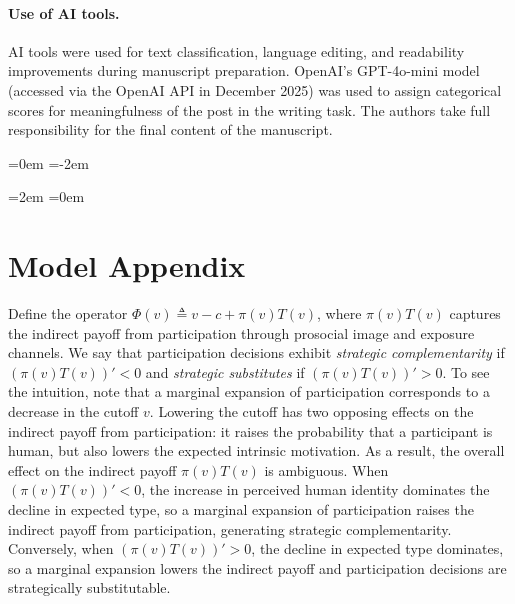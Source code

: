 \documentclass[12pt,notitlepage]{article}
\theoremstyle{plain}
\theoremstyle{plain}
\theoremstyle{definition}
\theoremstyle{definition}
\theoremstyle{assumption}
\theoremstyle{plain}
\theoremstyle{plain}
\theoremstyle{plain}
\theoremstyle{plain}
\theoremstyle{definition}%
\theoremstyle{plain}
\theoremstyle{plain}
\theoremstyle{plain}
\theoremstyle{plain}
\begin{document}
\paragraph{Use of AI tools.}
AI tools were used for text classification, language editing, and readability improvements during manuscript preparation. OpenAI's GPT-4o-mini model (accessed via the OpenAI API in December 2025) was used to assign categorical scores for meaningfulness of the post in the writing task. The authors take full responsibility for the final content of the manuscript.

\newpage\leftskip=0em 
\parindent=-2em
\onehalfspacing




\parindent=2em
\leftskip=0em

\clearpage{}

\pagebreak{}

\appendix

\setcounter{figure}{0} \renewcommand{\thefigure}{A\arabic{figure}}

\setcounter{table}{0} \renewcommand{\thetable}{A\arabic{table}}\pagestyle{fancy}


\section{Model Appendix}\label{appendix:theoretical framework}

Define the operator $\Phi(v)\triangleq v - c + \pi(v)T(v)$, where $\pi(v)T(v)$ captures the indirect payoff from participation through prosocial image and exposure channels. We say that participation decisions exhibit \textit{strategic complementarity} if $(\pi(v)T(v))'<0$ and \textit{strategic substitutes} if $(\pi(v)T(v))'>0$. To see the intuition, note that a marginal expansion of participation corresponds to a decrease in the cutoff $v$. Lowering the cutoff has two opposing effects on the indirect payoff from participation: it raises the probability that a participant is human, but also lowers the expected intrinsic motivation. As a result, the overall effect on the indirect payoff $\pi(v)T(v)$ is ambiguous. When $(\pi(v)T(v))'<0$, the increase in perceived human identity dominates the decline in expected type, so a marginal expansion of participation raises the indirect payoff from participation, generating strategic complementarity. Conversely, when $(\pi(v)T(v))'>0$, the decline in expected type dominates, so a marginal expansion lowers the indirect payoff and participation decisions are strategically substitutable.
\end{document}
